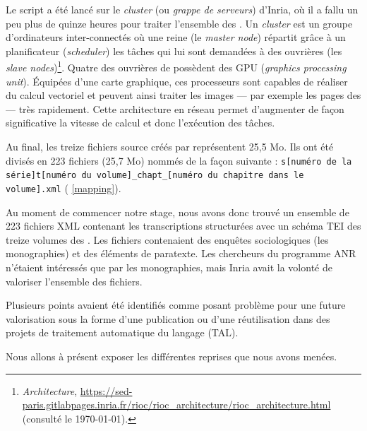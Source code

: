 Le script \lse{} a été lancé sur le \textit{cluster} (ou \textit{grappe de serveurs}) \rioc{} d'Inria, où il a fallu un peu plus de quinze heures pour traiter l'ensemble des \odm. Un \textit{cluster} est un groupe d'ordinateurs inter-connectés où une \og reine \fg{} (le \textit{master node}) répartit grâce à un \og planificateur \fg{} (\textit{scheduler}) les tâches qui lui sont demandées à des \og ouvrières \fg{} (les \textit{slave nodes})\footnote{\textit{\rioc{} Architecture}, \url{https://sed-paris.gitlabpages.inria.fr/rioc/rioc_architecture/rioc_architecture.html} (consulté le \today).}. Quatre des \og ouvrières \fg{} de \rioc{} possèdent des GPU (\textit{graphics processing unit}). Équipées d'une carte graphique, ces processeurs sont capables de réaliser du calcul vectoriel et peuvent ainsi traiter les images --- par exemple les pages des \odm{} --- très rapidement. Cette architecture en réseau permet d'augmenter de façon significative la vitesse de calcul et donc l'exécution des tâches.

Au final, les treize fichiers source créés par \lse{} représentent 25,5 Mo. Ils ont été divisés en 223 fichiers (25,7 Mo) nommés de la façon suivante : \texttt{s[numéro de la série]t[numéro du volume]\_chapt\_[numéro du chapitre dans le volume].xml} (\ann{} \ref{mapping}).

\clearpage


Au moment de commencer notre stage, nous avons donc trouvé un ensemble de 223 fichiers XML contenant les transcriptions structurées avec un schéma TEI des treize volumes des \odm. Les fichiers contenaient des enquêtes sociologiques (les monographies) et des éléments de paratexte. Les chercheurs du programme ANR \timeus{} n'étaient intéressés que par les monographies, mais Inria avait la volonté de valoriser l'ensemble des fichiers.

Plusieurs points avaient été identifiés comme posant problème pour une future valorisation sous la forme d'une publication ou d'une réutilisation dans des projets de traitement automatique du langage (TAL).

Nous allons à présent exposer les différentes reprises que nous avons menées.
